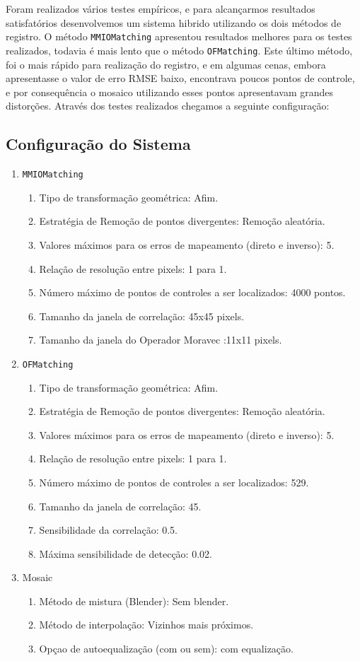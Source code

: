\documentclass[9pt, a4paper, nofonttune, journal]{IEEEtran}
\begin{document}
Foram realizados vários testes empíricos, e para alcançarmos resultados satisfatórios desenvolvemos um sistema hibrido utilizando os dois métodos de registro. O método \texttt{MMIOMatching} apresentou resultados melhores para os testes realizados, todavia é mais lento que o método \texttt{OFMatching}. Este último método, foi o mais rápido para realização do registro, e em algumas cenas, embora apresentasse o valor de erro RMSE baixo, encontrava poucos pontos de controle, e por consequência o mosaico utilizando esses pontos apresentavam grandes distorções. Através dos testes realizados chegamos a seguinte configuração:

\subsection{Configuração do Sistema}
\begin{enumerate}
\item \texttt{MMIOMatching}
	\begin{enumerate}
	 \item Tipo de transformação geométrica: Afim.
	 \item Estratégia de Remoção de pontos divergentes: Remoção aleatória.
	 \item Valores máximos para os erros de mapeamento (direto e inverso): 5.
	 \item Relação de resolução entre pixels: 1 para 1.
	 \item Número máximo de pontos de controles a ser localizados: 4000 pontos.
	 \item Tamanho da janela de correlação: 45x45 pixels.
	 \item Tamanho da janela do Operador Moravec :11x11 pixels.
	\end{enumerate}
 \item \texttt{OFMatching}
	 \begin{enumerate}
	  \item Tipo de transformação geométrica: Afim.
	  \item Estratégia de Remoção de pontos divergentes: Remoção aleatória.
	  \item Valores máximos para os erros de mapeamento (direto e inverso): 5.
	  \item Relação de resolução entre pixels: 1 para 1.
	  \item Número máximo de pontos de controles a ser localizados: 529.
	  \item Tamanho da janela de correlação: 45.
	  \item Sensibilidade da correlação: 0.5.
	  \item Máxima sensibilidade de detecção: 0.02.
	 \end{enumerate}
 \item Mosaic
	 \begin{enumerate}
	  \item Método de mistura (Blender): Sem blender.
	  \item Método de interpolação: Vizinhos mais próximos.
	  \item Opçao de autoequalização (com ou sem): com equalização.
	 \end{enumerate}
\end{enumerate}
\end{document}
